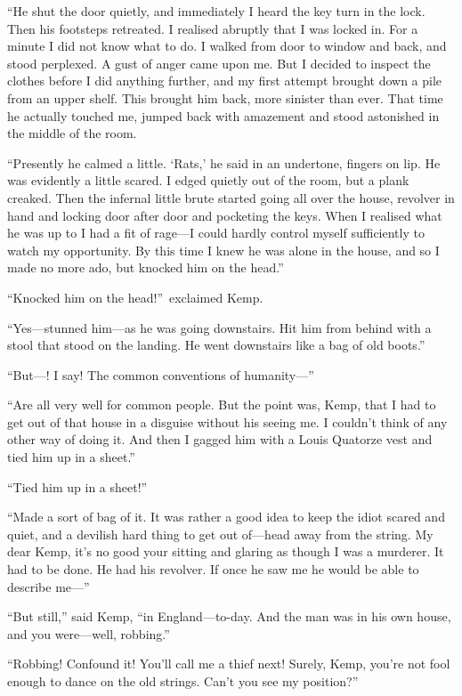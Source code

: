 “He shut the door quietly, and immediately I heard the key turn in the lock. Then his footsteps retreated. I realised abruptly that I was locked in. For a minute I did not know what to do. I walked from door to window and back, and stood perplexed. A gust of anger came upon me. But I decided to inspect the clothes before I did anything further, and my first attempt brought down a pile from an upper shelf. This brought him back, more sinister than ever. That time he actually touched me, jumped back with amazement and stood astonished in the middle of the room.

“Presently he calmed a little. ‘Rats,’ he said in an undertone, fingers on lip. He was evidently a little scared. I edged quietly out of the room, but a plank creaked. Then the infernal little brute started going all over the house, revolver in hand and locking door after door and pocketing the keys. When I realised what he was up to I had a fit of rage—I could hardly control myself sufficiently to watch my opportunity. By this time I knew he was alone in the house, and so I made no more ado, but knocked him on the head.”

“Knocked him on the head!”\ exclaimed Kemp.

“Yes—stunned him—as he was going downstairs. Hit him from behind with a stool that stood on the landing. He went downstairs like a bag of old boots.”

“But—! I say! The common conventions of humanity—”

“Are all very well for common people. But the point was, Kemp, that I had to get out of that house in a disguise without his seeing me. I couldn’t think of any other way of doing it. And then I gagged him with a Louis Quatorze vest and tied him up in a sheet.”

“Tied him up in a sheet!”

“Made a sort of bag of it. It was rather a good idea to keep the idiot scared and quiet, and a devilish hard thing to get out of—head away from the string. My dear Kemp, it’s no good your sitting and glaring as though I was a murderer. It had to be done. He had his revolver. If once he saw me he would be able to describe me—”

“But still,” said Kemp, “in England—to-day. And the man was in his own house, and you were—well, robbing.”

“Robbing! Confound it! You’ll call me a thief next! Surely, Kemp, you’re not fool enough to dance on the old strings. Can’t you see my position?”


